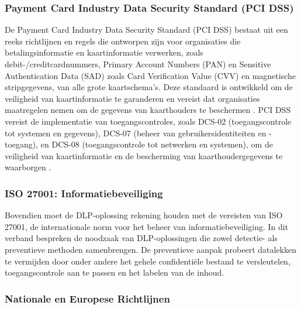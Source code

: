 \subsubsection{Payment Card Industry Data Security Standard (PCI DSS)}%

De Payment Card Industry Data Security Standard (PCI DSS) bestaat uit een reeks richtlijnen en regels die ontworpen zijn voor organisaties die betalingsinformatie en kaartinformatie verwerken, zoals debit-/creditcardnummers, Primary Account Numbers (PAN) en Sensitive Authentication Data (SAD) zoals Card Verification Value (CVV) en magnetische stripgegevens, van alle grote kaartschema’s. Deze standaard is ontwikkeld om de veiligheid van kaartinformatie te garanderen en vereist dat organisaties maatregelen nemen om de gegevens van kaarthouders te beschermen \autocite{Elluri2018}. PCI DSS vereist de implementatie van toegangscontroles, zoals DCS-02 (toegangscontrole tot systemen en gegevens), DCS-07 (beheer van gebruikersidentiteiten en -toegang), en DCS-08 (toegangscontrole tot netwerken en systemen), om de veiligheid van kaartinformatie en de bescherming van kaarthoudergegevens te waarborgen \autocite{Elluri2018}.

\subsubsection{ISO 27001: Informatiebeveiliging}%

Bovendien moet de DLP-oplossing rekening houden met de vereisten van ISO 27001, de internationale norm voor het beheer van informatiebeveiliging. In dit verband bespreken \textcite{Alsanabani2020} de noodzaak van DLP-oplossingen die zowel detectie- als preventieve methoden samenbrengen. De preventieve aanpak probeert datalekken te vermijden door onder andere het gehele confidentiële bestand te versleutelen, toegangscontrole aan te passen en het labelen van de inhoud.

\subsubsection{Nationale en Europese Richtlijnen}%

